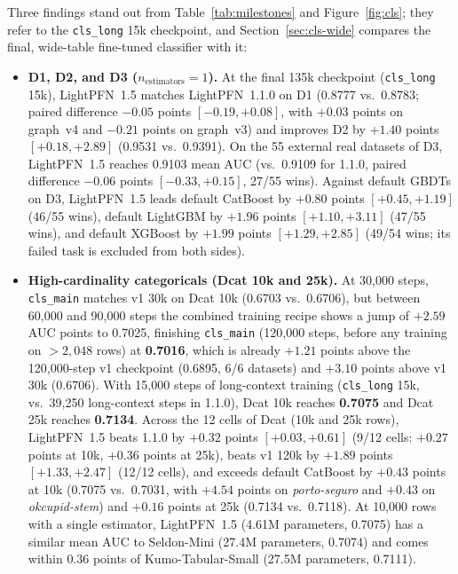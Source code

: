 \documentclass[11pt]{article}
\begin{document}
Three findings stand out from Table~\ref{tab:milestones} and Figure~\ref{fig:cls}; they refer to the \texttt{cls\_long} 15k checkpoint, and Section~\ref{sec:cls-wide} compares the final, wide-table fine-tuned classifier with it:
\begin{itemize}
\item \textbf{D1, D2, and D3 ($n_{\text{estimators}}=1$).}
At the final 135k checkpoint (\texttt{cls\_long} 15k), LightPFN~1.5 matches LightPFN~1.1.0 on D1 (0.8777 vs.\ 0.8783; paired difference $-0.05$ points $[-0.19, +0.08]$, with $+0.03$ points on graph~v4 and $-0.21$ points on graph~v3) %
and improves D2 by $+1.40$ points $[+0.18, +2.89]$ (0.9531 vs.\ 0.9391). %
On the 55 external real datasets of D3, LightPFN~1.5 reaches 0.9103 mean AUC (vs.\ 0.9109 for 1.1.0, paired difference $-0.06$ points $[-0.33, +0.15]$, 27/55 wins). %
Against default GBDTs on D3, LightPFN~1.5 leads default CatBoost by $+0.80$ points $[+0.45, +1.19]$ (46/55 wins), default LightGBM by $+1.96$ points $[+1.10, +3.11]$ (47/55 wins), and default XGBoost by $+1.99$ points $[+1.29,+2.85]$ (49/54 wins; its failed task is excluded from both sides). %
\item \textbf{High-cardinality categoricals (Dcat 10k and 25k).}
At 30,000 steps, \texttt{cls\_main} matches v1 30k on Dcat 10k (0.6703 vs.\ 0.6706), but between 60,000 and 90,000 steps the combined training recipe shows a jump of $+2.59$ AUC points to 0.7025, finishing \texttt{cls\_main} (120,000 steps, before any training on $>2{,}048$ rows) at \textbf{0.7016}, which is already $+1.21$ points above the 120,000-step v1 checkpoint (0.6895, 6/6 datasets) and $+3.10$ points above v1 30k (0.6706). %
With 15,000 steps of long-context training (\texttt{cls\_long} 15k, vs.\ 39,250 long-context steps in 1.1.0), Dcat 10k reaches \textbf{0.7075} and Dcat 25k reaches \textbf{0.7134}. %
Across the 12 cells of Dcat (10k and 25k rows), LightPFN~1.5 beats 1.1.0 by $+0.32$ points $[+0.03,+0.61]$ (9/12 cells: $+0.27$ points at 10k, $+0.36$ points at 25k), beats v1 120k by $+1.89$ points $[+1.33, +2.47]$ (12/12 cells), and exceeds default CatBoost by $+0.43$ points at 10k (0.7075 vs.\ 0.7031, with $+4.54$ points on \emph{porto-seguro} and $+0.43$ on \emph{okcupid-stem}) and $+0.16$ points at 25k (0.7134 vs.\ 0.7118). %
At 10,000 rows with a single estimator, LightPFN~1.5 (4.61M parameters, 0.7075) has a similar mean AUC to Seldon-Mini \cite{seldon} (27.4M parameters, 0.7074) and comes within $0.36$ points of Kumo-Tabular-Small \cite{kumo} (27.5M parameters, 0.7111). %

\end{itemize}
\end{document}
